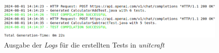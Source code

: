 \begin{figure}[h]
    \centering
    \includegraphics[width=1\textwidth]{Assets/Images/tests.png}
    \caption{Ausgabe der \textit{Logs} für die erstellten Tests in \textit{unitcraft}}
    \label{fig:tests}
\end{figure}